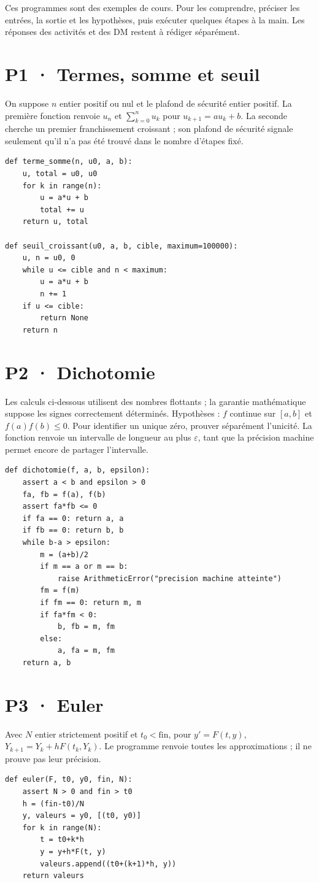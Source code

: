 Ces programmes sont des exemples de cours. Pour les comprendre, préciser les entrées, la sortie et les hypothèses, puis exécuter quelques étapes à la main. Les réponses des activités et des DM restent à rédiger séparément.
\section{P1 · Termes, somme et seuil}
On suppose $n$ entier positif ou nul et le plafond de sécurité entier positif. La première fonction renvoie $u_n$ et $\sum_{k=0}^n u_k$ pour $u_{k+1}=au_k+b$. La seconde cherche un premier franchissement croissant ; son plafond de sécurité signale seulement qu'il n'a pas été trouvé dans le nombre d'étapes fixé.
\begin{lstlisting}
def terme_somme(n, u0, a, b):
    u, total = u0, u0
    for k in range(n):
        u = a*u + b
        total += u
    return u, total

def seuil_croissant(u0, a, b, cible, maximum=100000):
    u, n = u0, 0
    while u <= cible and n < maximum:
        u = a*u + b
        n += 1
    if u <= cible:
        return None
    return n
\end{lstlisting}
\section{P2 · Dichotomie}
Les calculs ci-dessous utilisent des nombres flottants ; la garantie mathématique suppose les signes correctement déterminés. Hypothèses : $f$ continue sur $[a,b]$ et $f(a)f(b)\le0$. Pour identifier un unique zéro, prouver séparément l'unicité. La fonction renvoie un intervalle de longueur au plus $\varepsilon$, tant que la précision machine permet encore de partager l'intervalle.
\begin{lstlisting}
def dichotomie(f, a, b, epsilon):
    assert a < b and epsilon > 0
    fa, fb = f(a), f(b)
    assert fa*fb <= 0
    if fa == 0: return a, a
    if fb == 0: return b, b
    while b-a > epsilon:
        m = (a+b)/2
        if m == a or m == b:
            raise ArithmeticError("precision machine atteinte")
        fm = f(m)
        if fm == 0: return m, m
        if fa*fm < 0:
            b, fb = m, fm
        else:
            a, fa = m, fm
    return a, b
\end{lstlisting}
\mxnewpage\section{P3 · Euler}
Avec $N$ entier strictement positif et $t_0<\text{fin}$, pour $y'=F(t,y)$, $Y_{k+1}=Y_k+hF(t_k,Y_k)$. Le programme renvoie toutes les approximations ; il ne prouve pas leur précision.
\begin{lstlisting}
def euler(F, t0, y0, fin, N):
    assert N > 0 and fin > t0
    h = (fin-t0)/N
    y, valeurs = y0, [(t0, y0)]
    for k in range(N):
        t = t0+k*h
        y = y+h*F(t, y)
        valeurs.append((t0+(k+1)*h, y))
    return valeurs
\end{lstlisting}

